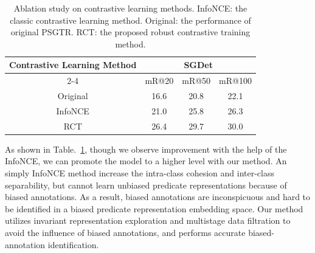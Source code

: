 \documentclass[letterpaper]{article} %
\begin{document}
\begin{table}[]

\tabcolsep=0.05cm
\begin{tabular}{c|ccc}
\hline
\multirow{2}{*}{Contrastive Learning Method} & \multicolumn{3}{c}{SGDet} \\ \cline{2-4} 
                                         & mR@20  & mR@50  & mR@100  \\ \hline
Original                                 & 16.6   & 20.8   & 22.1    \\ \hline
InfoNCE                                & 21.0   & 25.8   & 26.3    \\ \hline


RCT                                  & 26.4   & 29.7   & 30.0    \\ \hline
\end{tabular}
\caption{Ablation study on contrastive learning methods. InfoNCE: the classic contrastive learning method. Original: the performance of original PSGTR. RCT: the proposed robust contrastive training method.}
\label{nce}
\end{table}





As shown in Table.~\ref{nce}, though we observe improvement with the help of the InfoNCE, we can promote the model to a higher level with our method. An simply InfoNCE method increase the intra-class cohesion and inter-class separability, but cannot learn unbiased predicate representations because of biased annotations. As a result, biased annotations are inconspicuous and hard to be identified in a biased predicate representation embedding space. Our method utilizes invariant representation exploration and multistage data filtration to avoid the influence of biased annotations, and performs accurate biased-annotation identification.
\end{document}
